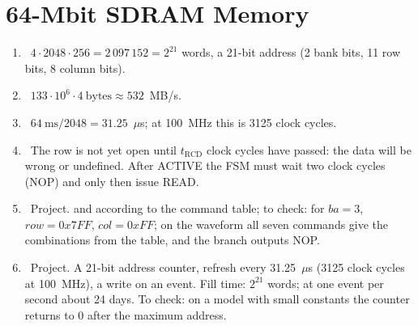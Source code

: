 \section*{64-Mbit SDRAM Memory}
\begin{enumerate}
  \item {}~$4\cdot 2048\cdot 256 = 2\,097\,152=2^{21}$ words, a 21-bit address (2 bank bits, 11 row bits, 8 column bits).
  \item {}~$133\cdot 10^6\cdot 4~\text{bytes}\approx 532$~MB/s.
  \item {}~$64~\text{ms}/2048=31.25$~$\mu$s; at 100~MHz this is 3125 clock cycles.
  \item {}~The row is not yet open until $t_\text{RCD}$ clock cycles have passed: the data will be wrong or undefined. After ACTIVE the FSM must wait two clock cycles (NOP) and only then issue READ.
  \item {}~Project.  and  according to the command table; to check: for  $ba=3$, $row=0x7FF$, $col=0xFF$; on the waveform all seven commands give the combinations from the table, and the  branch outputs NOP.
  \item {}~Project. A 21-bit address counter, refresh every 31.25~$\mu$s (3125 clock cycles at 100~MHz), a write on an event. Fill time: $2^{21}$ words; at one event per second about 24 days. To check: on a model with small constants the counter returns to 0 after the maximum address.
\end{enumerate}

